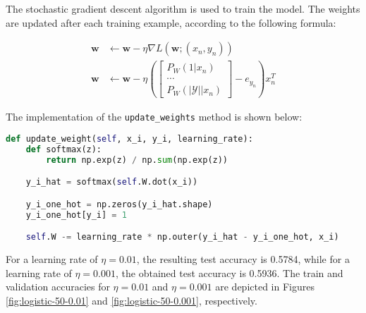 \documentclass[12pt]{article}
\begin{document}
\begin{enumerate}[leftmargin=\labelsep]
\begin{enumerate}[label=\alph*)]
                    \vspace{12pt}
                    The stochastic gradient descent algorithm is used to train the model. The weights are updated after each training example, according to the following formula:

                    \begin{equation}
                        \begin{aligned}
                            \mathbf{w} & \leftarrow \mathbf{w} - \eta \nabla L(\mathbf{w}; (x_n, y_n))            \\
                            \mathbf{w} & \leftarrow \mathbf{w} - \eta \left(\begin{bmatrix}
                                                                                P_W(1 | x_n) \\
                                                                                \cdots       \\
                                                                                P_W(|\mathcal{Y}| | x_n)
                                                                            \end{bmatrix} - e_{y_n} \right) x_n^T
                        \end{aligned}
                    \end{equation}

                    \vspace{12pt}

                    The implementation of the \texttt{update\_weights} method is shown below:

                    \begin{lstlisting}[language=Python]
def update_weight(self, x_i, y_i, learning_rate):
    def softmax(z):
        return np.exp(z) / np.sum(np.exp(z))

    y_i_hat = softmax(self.W.dot(x_i))

    y_i_one_hot = np.zeros(y_i_hat.shape)
    y_i_one_hot[y_i] = 1

    self.W -= learning_rate * np.outer(y_i_hat - y_i_one_hot, x_i)\end{lstlisting}

                    \vspace{12pt}

                    For a learning rate of $\eta = 0.01$, the resulting test accuracy is 0.5784, while for a learning rate of $\eta = 0.001$, the obtained test accuracy is 0.5936. The train and validation accuracies for $\eta = 0.01$ and $\eta = 0.001$ are depicted in Figures \ref{fig:logistic-50-0.01} and \ref{fig:logistic-50-0.001}, respectively.


\end{enumerate}
\end{enumerate}
\end{document}
